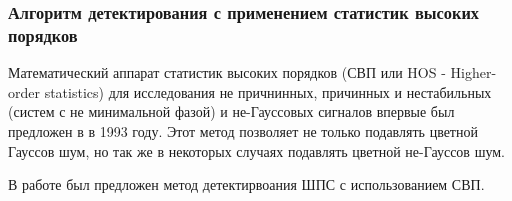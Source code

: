 \subsubsection{Алгоритм детектирования с применением статистик высоких порядков}
\label{sbs:sec1_hos}

Математический аппарат статистик высоких порядков (СВП или HOS - Higher-order statistics)
для исследования не причнинных, причинных и нестабильных
(систем с не минимальной фазой) и не-Гауссовых сигналов впервые был предложен в \cite{hos_petropulu} в 1993 году.
Этот метод позволяет не только подавлять цветной Гауссов шум, но так же в некоторых случаях подавлять
цветной не-Гауссов шум.

В работе \cite{hos_zhao} был предложен метод детектирвоания ШПС с использованием СВП.

\newpage
